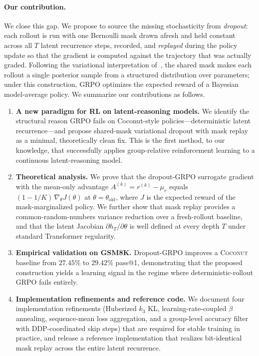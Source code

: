 \documentclass[11pt]{article}
\theoremstyle{definition}
\theoremstyle{remark}
\newcommand{\old}{\mathrm{old}}
\begin{document}
\paragraph{Our contribution.}
We close this gap.  We propose to source the missing stochasticity from
\emph{dropout}: each rollout is run with one Bernoulli mask drawn afresh
and held constant across all $T$ latent recurrence steps, recorded, and
\emph{replayed} during the policy update so that the gradient is
computed against the trajectory that was actually graded.  Following the
variational interpretation of~\citet{gal2016dropout}, the shared mask
makes each rollout a single posterior sample from a structured
distribution over parameters; under this construction, GRPO optimizes
the expected reward of a Bayesian model-average policy.  We summarize
our contributions as follows.

\begin{enumerate}[topsep=2pt,itemsep=2pt,leftmargin=*]
\item \textbf{A new paradigm for RL on latent-reasoning models.}  We
      identify the structural reason GRPO fails on Coconut-style
      policies---deterministic latent recurrence---and propose
      shared-mask variational dropout with mask replay as a minimal,
      theoretically clean fix.  This is the first method, to our
      knowledge, that successfully applies group-relative reinforcement
      learning to a continuous latent-reasoning model.
\item \textbf{Theoretical analysis.}  We prove that the dropout-GRPO
      surrogate gradient with the mean-only advantage
      $A^{(k)} = r^{(k)} - \mu_r$ equals
      $(1 - 1/K)\,\nabla_\theta J(\theta)$ at $\theta = \theta_\old$,
      where $J$ is the expected reward of the mask-marginalized policy.
      We further show that mask replay provides a common-random-numbers
      variance reduction over a fresh-rollout baseline, and that the
      latent Jacobian $\partial h_T / \partial \theta$ is well defined
      at every depth $T$ under standard Transformer regularity.
\item \textbf{Empirical validation on GSM8K.}  Dropout-GRPO improves a
      \textsc{Coconut} baseline from $27.45\%$ to $29.42\%$ pass@1,
      demonstrating that the proposed construction yields a learning
      signal in the regime where deterministic-rollout GRPO fails
      entirely.
\item \textbf{Implementation refinements and reference code.}  We
      document four implementation refinements (Huberized $k_3$ KL,
      learning-rate-coupled $\beta$ annealing, sequence-mean loss
      aggregation, and a group-level accuracy filter with
      DDP-coordinated skip steps) that are required for stable
      training in practice, and release a reference implementation
      that realizes bit-identical mask replay across the entire latent
      recurrence.
\end{enumerate}
\end{document}
